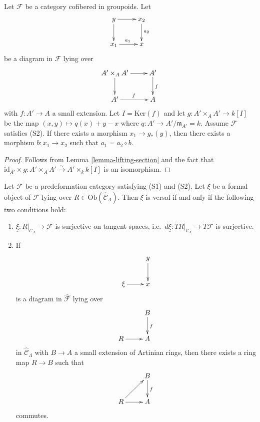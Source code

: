 \begin{lemma}
\label{lemma-lifting-along-small-extension}
Let $\mathcal{F}$ be a category cofibered in groupoids.  Let
\[
\xymatrix{
y \ar[r] \ar[d] & x_2 \ar[d]^{a_2} \\
x_1 \ar[r]^{a_1}        & x
}
\]
be a diagram in $\mathcal{F}$ lying over
\[
\xymatrix{
A' \times_{A} A' \ar[r] \ar[d] & A' \ar[d]^{f} \\
A' \ar[r]^{f} & A
}
\]
with $f: A' \to A$ a small extension. Let $I = \text{Ker}(f)$ and 
let $g: A' \times_{A} A' \to k[I]$ be the map $(x,y) \mapsto q(x) + y - 
x$ where $q: A' \to A'/\mathfrak{m}_{A'} = k$.  Assume $\mathcal{F}$ 
satisfies (S2). If there exists a morphism $x_1 \to 
g_*(y)$, then there exists a morphism $b: x_1 \to x_2$ such that $a_1 = 
a_2 \circ b$.
\end{lemma}

\begin{proof}
Follows from Lemma \ref{lemma-lifting-section} and the fact that 
$\text{id}_{A'} \times g: A' \times_{A} A' \xrightarrow{\sim} A' 
\times_{k} k[I]$ is an isomorphism.  
\end{proof}

\begin{lemma}
\label{lemma-versal-criterion}
Let $\mathcal{F}$ be a predeformation category satisfying (S1) and 
(S2).  Let $\xi$ be a formal object of $\mathcal{F}$ lying over $R 
\in \text{Ob}(\widehat{\mathcal{C}}_\Lambda)$.  Then $\xi$ is versal if 
and only if the following two conditions hold:
\begin{enumerate}
\item $\underline{\xi}: \underline{R}|_{\mathcal{C}_\Lambda} \to 
\mathcal{F}$ is surjective on tangent spaces, i.e.\ $d\underline{\xi}: T 
\underline{R}|_{\mathcal{C}_\Lambda} \to T\mathcal{F}$ is surjective.
\item If 
\[
\xymatrix{
            &  y \ar[d] \\
\xi \ar[r]  &  x
}
\]
is a diagram in $\widehat{\mathcal{F}}$ lying over
\[
\xymatrix{
         &   B  \ar[d]^{f} \\
R \ar[r] &   A 
}
\]
in $\widehat{\mathcal{C}}_\Lambda$ with $B \to A$ a small extension of 
Artinian rings, then there exists a ring map $R \to B$ such that
\[
\xymatrix{
         &   B  \ar[d]^{f} \\
R \ar[ur] \ar[r] &   A 
}
\]
commutes.
\end{enumerate}
\end{lemma}

